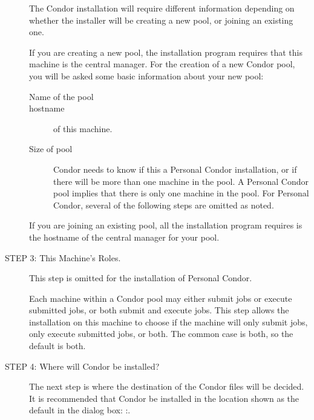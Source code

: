 \begin{description}
     The Condor installation will require different
     information depending on whether the installer will
	 be creating a new pool, or joining an existing one.

     If you are creating a new pool, the installation program
	 requires that this machine is the central manager.  
     For the creation of a new Condor pool, you will be asked
	 some basic information about your new pool:
     \begin{description}
     \item[Name of the pool]
     \item[hostname] of this machine.
     \item[Size of pool]
       Condor needs to know if this a Personal Condor installation,
       or if there will be more than one machine in the pool.
       A Personal Condor pool
       implies that there is only one machine in the pool.
       For Personal Condor, several of the following
       steps are omitted as noted.
     \end{description}

     If you are joining an existing pool, all the installation program
	 requires is the hostname of the central manager for your pool.

\item[STEP 3: This Machine's Roles.] 

     This step is omitted for the installation of Personal Condor.

     Each machine within a Condor pool may either
     submit jobs or execute submitted jobs, or both
     submit and execute jobs.
     This step allows the installation on this machine
     to choose if the machine will only submit jobs,
     only execute submitted jobs, or both.
     The common case is both, so the default is both.

\item[STEP 4: Where will Condor be installed?]

The next step is where the destination of the Condor files will be
decided.
It is recommended that Condor be installed in the location shown as the default in the dialog box:
\verb@C:\Condor@.


\end{description}
